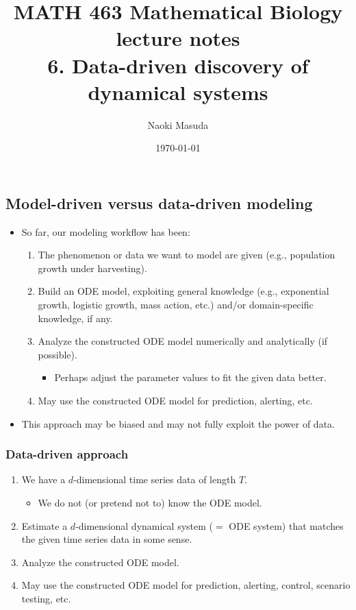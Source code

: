 \documentclass[20pt]{extarticle}
\begin{document}
\title{MATH 463 Mathematical Biology\\ lecture notes\\
6. Data-driven discovery of dynamical systems}
\date{\today}
\author{Naoki Masuda}

\maketitle

\subsection*{Model-driven versus data-driven modeling}

\begin{itemize}
%
\item So far, our modeling workflow has been:
	\begin{enumerate}
	\item The phenomenon or data we want to model are given (e.g., population growth under harvesting).
	\item Build an ODE model, exploiting general knowledge (e.g., exponential growth, logistic growth, mass action, etc.) and/or domain-specific knowledge, if any.
	\item Analyze the constructed ODE model numerically and analytically (if possible).
		\begin{itemize}
		\item Perhaps adjust the parameter values to fit the given data better.
		\end{itemize}
	\item May use the constructed ODE model for prediction, alerting, etc.
	\end{enumerate}
\item This approach may be biased and may not fully exploit the power of data.
%
\end{itemize}

\subsubsection*{Data-driven approach}

\begin{enumerate}
\item We have a $d$-dimensional time series data of length $T$.
	\begin{itemize}
	\item We do not (or pretend not to) know the ODE model.
	\end{itemize}
\item Estimate a $d$-dimensional dynamical system ($=$ ODE system) that matches the given time series data in some sense.
\item Analyze the constructed ODE model.
\item May use the constructed ODE model for prediction, alerting, control, scenario testing, etc.
\end{enumerate}
\end{document}
